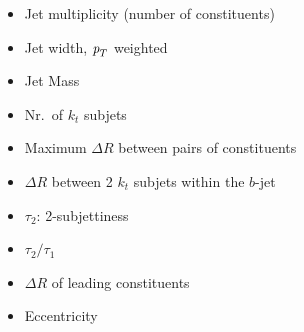 \begin{itemize}\addtolength{\itemsep}{-0.4\baselineskip}
\item
Jet multiplicity (number of constituents)
\item
Jet width, ${\emph{p}_{T}}$ weighted %
\item 
Jet Mass
\item
Nr.\ of $k_t$ subjets %
\item
Maximum $\Delta R$ between pairs of constituents %
\item
$\Delta R$ between 2 $k_t$ subjets within the $b$-jet
\item
$\tau_2$: 2-subjettiness 
\item
$\tau_2/\tau_1$
\item
$\Delta R$ of leading constituents %
\item 
Eccentricity %
\end{itemize}



